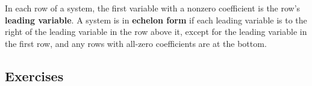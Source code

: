 \begin{definition}
    In each row of a system, the first variable with a nonzero coefficient is the row's \textbf{leading variable}. A system is in \textbf{echelon form} if each leading variable is to the right of the leading variable in the row above it, except for the leading variable in the first row, and any rows with all-zero coefficients are at the bottom.
\end{definition}


\subsection{Exercises}
